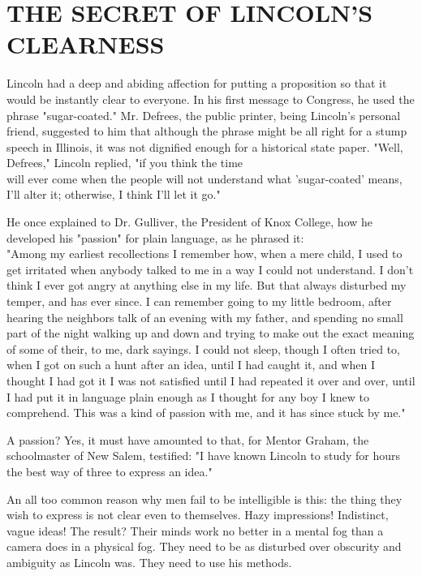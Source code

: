 \documentclass[10pt]{article}
\begin{document}
\section*{THE SECRET OF LINCOLN'S CLEARNESS}
Lincoln had a deep and abiding affection for putting a proposition so that it would be instantly clear to everyone. In his first message to Congress, he used the phrase "sugar-coated." Mr. Defrees, the public printer, being Lincoln's personal friend, suggested to him that although the phrase might be all right for a stump speech in Illinois, it was not dignified enough for a historical state paper. "Well, Defrees," Lincoln replied, "if you think the time\\
will ever come when the people will not understand what 'sugar-coated' means, I'll alter it; otherwise, I think I'll let it go."

He once explained to Dr. Gulliver, the President of Knox College, how he developed his "passion" for plain language, as he phrased it:\\
"Among my earliest recollections I remember how, when a mere child, I used to get irritated when anybody talked to me in a way I could not understand. I don't think I ever got angry at anything else in my life. But that always disturbed my temper, and has ever since. I can remember going to my little bedroom, after hearing the neighbors talk of an evening with my father, and spending no small part of the night walking up and down and trying to make out the exact meaning of some of their, to me, dark sayings. I could not sleep, though I often tried to, when I got on such a hunt after an idea, until I had caught it, and when I thought I had got it I was not satisfied until I had repeated it over and over, until I had put it in language plain enough as I thought for any boy I knew to comprehend. This was a kind of passion with me, and it has since stuck by me."

A passion? Yes, it must have amounted to that, for Mentor Graham, the schoolmaster of New Salem, testified: "I have known Lincoln to study for hours the best way of three to express an idea."

An all too common reason why men fail to be intelligible is this: the thing they wish to express is not clear even to themselves. Hazy impressions! Indistinct, vague ideas! The result? Their minds work no better in a mental fog than a camera does in a physical fog. They need to be as disturbed over obscurity and ambiguity as Lincoln was. They need to use his methods.
\end{document}
